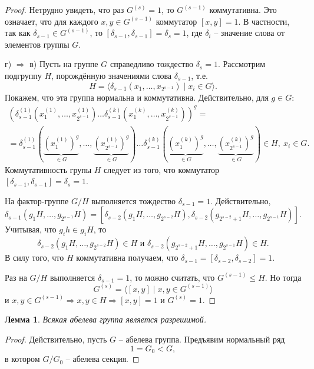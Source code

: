 \documentclass{article}
\newtheorem{lemma}{Лемма}[section]
\begin{document}
\begin{proof}
    Нетрудно увидеть, что раз $G^{(s)} = 1$, то $G^{(s - 1)}$ коммутативна. Это означает, что для каждого $x, y \in G^{(s - 1)}$ коммутатор $[x, y] = 1$. В частности, так как $\delta_{s - 1} \in G^{(s - 1)}$, то $[\delta_{s - 1}, \delta_{s - 1}] = \delta_s = 1$, где $\delta_i$ -- значение слова от элементов группы $G$.

    г) $\Rightarrow$  в) Пусть на группе $G$ справедливо тождество $\delta_s = 1$. Рассмотрим подгруппу $H$, порождённую значениями слова $\delta_{s - 1}$, т.е. $$ H = \langle \delta_{s - 1}(x_1, \ldots, x_{2^{s - 1}}) \mid x_i \in G \rangle. $$
    Покажем, что эта группа нормальна и коммутативна. Действительно, для $g \in G$:
    \begin{gather*}
        (\delta_{s - 1}^{(1)}(x_1^{(1)}, \ldots, x_{2^{s - 1}}^{(1)}) \ldots \delta_{s - 1}^{(k)}(x_1^{(k)}, \ldots, x_{2^{s - 1}}^{(k)}))^g = \\
        = \delta_{s - 1}^{(1)}(\underbrace{(x_1^{(1)})^g}_{\in G}, \ldots, \underbrace{(x_{2^{s - 1}}^{(1)})^g}_{\in G}) \ldots \delta_{s - 1}^{(k)}(\underbrace{(x_1^{(k)})^g}_{\in G}, \ldots, \underbrace{(x_{2^{s - 1}}^{(k)})^g}_{\in G}) \in H, \ x_i \in G.
    \end{gather*}
    Коммутативность групы $H$ следует из того, что коммутатор $[\delta_{s - 1}, \delta_{s - 1}] = \delta_s = 1$.

    На фактор-группе $G / H$ выполняется тождество $\delta_{s - 1} = 1$. Действительно,
    \[
        \delta_{s - 1}(g_1H, \ldots, g_{2^{s - 1}}H) = [\delta_{s - 2}(g_1H, \ldots, g_{2^{s - 2}}H), \delta_{s - 2}(g_{2^{s - 2} + 1}H, \ldots, g_{2^{s - 1}}H)].
    \]
    Учитывая, что $g_i h \in g_i H$, то $$ \delta_{s - 2}(g_1H, \ldots, g_{2^{s - 2}}H) \in H \text{ и } \delta_{s - 2}(g_{2^{s - 2} + 1}H, \ldots, g_{2^{s - 1}}H) \in H. $$
    В силу того, что $H$ коммутативна получаем, что $\delta_{s - 1} = [\delta_{s - 2}, \delta_{s - 2}] = 1$.

    Раз на $G/H$ выполняется $\delta_{s - 1} = 1$, то можно считать, что $G^{(s - 1)} \leqslant H$. Но тогда
    \[
        G^{(s)} = \langle [x, y] \mid x,y \in G^{(s - 1)} \rangle
    \]
    и $x,y \in G^{(s - 1)} \Rightarrow x, y \in H \Rightarrow [x, y] = 1$ и $G^{(s)} = 1$.
\end{proof}

\begin{lemma}
    Всякая абелева группа является разрешимой.
\end{lemma}
\begin{proof}
    Действительно, пусть $G$ -- абелева группа. Предъявим нормальный ряд $$ 1 = G_0 < G, $$ в котором $G/G_0$ -- абелева секция.
\end{proof}
\end{document}
